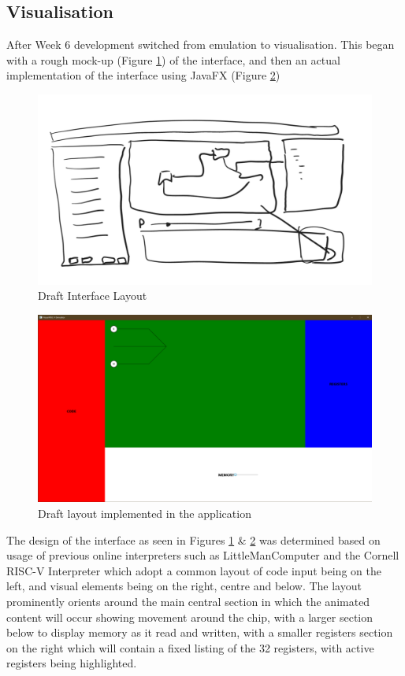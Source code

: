 \documentclass[a4paper,fleqn,twoside,12pt]{article}
\begin{document}
\subsection{Visualisation}
After Week 6 development switched from emulation to visualisation. This began with a rough mock-up (Figure \ref{fig:draft_layout}) of the interface, and then an actual implementation of the interface using JavaFX (Figure \ref{fig:javafx_layout})

\begin{figure}[H]
    \centering
    \includegraphics[scale=0.5]{progress-report/draft_layout.png}
    \caption{Draft Interface Layout}
    \label{fig:draft_layout}
\end{figure}
\begin{figure}[H]
    \centering
    \includegraphics[scale=0.5]{progress-report/javafx_layout.png}
    \caption{Draft layout implemented in the application}
    \label{fig:javafx_layout}
\end{figure}

The design of the interface as seen in Figures \ref{fig:draft_layout} \& \ref{fig:javafx_layout} was determined based on usage of previous online interpreters such as LittleManComputer \cite{higginson_2014_little} and the Cornell RISC-V Interpreter \cite{cornelluniversity_riscv} which adopt a common layout of code input being on the left, and visual elements being on the right, centre and below. The layout prominently orients around the main central section in which the animated content will occur showing movement around the chip, with a larger section below to display memory as it read and written, with a smaller registers section on the right which will contain a fixed listing of the 32 registers, with active registers being highlighted.
\end{document}

